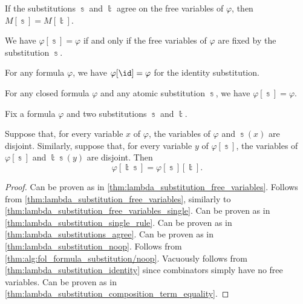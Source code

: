 \begin{proposition}
\begin{thmenum}
     If the substitutions \( \Bbbs \) and \( \Bbbt \) agree on the free variables of \( \varphi \), then \( M[\Bbbs] = M[\Bbbt] \).

     We have \( \varphi[\Bbbs] = \varphi \) if and only if the free variables of \( \varphi \) are fixed by the substitution \( \Bbbs \).

     For any formula \( \varphi \), we have \( \varphi[\id] = \varphi \) for the identity substitution.

     For any closed formula \( \varphi \) and any atomic substitution \( \Bbbs \), we have \( \varphi[\Bbbs] = \varphi \).

     Fix a formula \( \varphi \) and two substitutions \( \Bbbs \) and \( \Bbbt \).

    Suppose that, for every variable \( x \) of \( \varphi \), the variables of \( \varphi \) and \( \Bbbs(x) \) are disjoint. Similarly, suppose that, for every variable \( y \) of \( \varphi[\Bbbs] \), the variables of \( \varphi[\Bbbs] \) and \( \Bbbt\Bbbs(y) \) are disjoint. Then
    \begin{equation}\label{eq:thm:alg:fol_formula_substitution/composition}
      \varphi[\Bbbt\Bbbs] = \varphi[\Bbbs][\Bbbt].
    \end{equation}
  \end{thmenum}
\end{proposition}
\begin{proof}
   Can be proven as in \cref{thm:lambda_substitution_free_variables}.
   Follows from \cref{thm:lambda_substitution_free_variables}, similarly to \cref{thm:lambda_substitution_free_variables_single}.
   Can be proven as in \cref{thm:lambda_substitution_single_rule}.
   Can be proven as in \cref{thm:lambda_substitutions_agree}.
   Can be proven as in \cref{thm:lambda_substitution_noop}.
   Follows from \cref{thm:alg:fol_formula_substitution/noop}.
   Vacuously follows from \cref{thm:lambda_substitution_identity} since combinators simply have no free variables.
   Can be proven as in \cref{thm:lambda_substitution_composition_term_equality}.
\end{proof}

